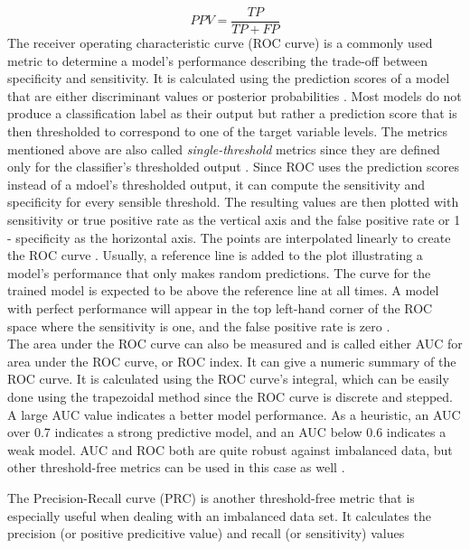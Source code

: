 \begin{equation}
 PPV = \frac{TP}{TP+FP}
 \label{eq:ppv}
\end{equation}
The receiver operating characteristic curve (ROC curve) is a commonly used 
metric to determine a model's performance describing the trade-off between 
specificity and sensitivity. It is calculated using the prediction scores of a 
model that are either discriminant values or posterior 
probabilities \cite{RN161}. Most models do not produce a classification label 
as their output but rather a prediction score that is then thresholded to 
correspond to one of the target variable levels. The metrics mentioned above 
are also called \textit{single-threshold} metrics since they are defined only 
for the 
classifier's thresholded output \cite{RN161, RN167}. Since ROC uses the 
prediction scores instead of a mdoel's thresholded output, it can compute 
the sensitivity and specificity for every sensible threshold. The resulting 
values are then plotted with sensitivity or true positive rate as the vertical 
axis and the false positive rate or 1 - specificity as the 
horizontal axis. The points are interpolated linearly to create the ROC curve  
\cite{RN161}. Usually, a reference line is added to the plot illustrating a 
model's performance that only makes random predictions. The curve for the 
trained model is expected to be above the reference line at all times. 
A model with perfect performance will appear in the top left-hand corner 
of the ROC space where the sensitivity is one, and the false positive rate is 
zero \cite{RN167, RN159}.
\\
The area under the ROC curve can also be measured and is called either AUC for 
area under the ROC curve, or ROC index. It can give a numeric summary of the 
ROC curve. It is calculated using the ROC curve's integral, which can be easily 
done using the trapezoidal method since the ROC curve is discrete and stepped. 
A large AUC value indicates a better model performance. As a heuristic, an 
AUC over 0.7 indicates a strong predictive model, and an AUC below 0.6 
indicates 
a weak model. AUC and ROC both are quite robust against imbalanced data, but 
other threshold-free metrics can be used in this case as 
well \cite{RN167, RN159}.
\par
The Precision-Recall curve (PRC) is another threshold-free metric that is 
especially useful when dealing with an imbalanced data set. It calculates the 
precision (or positive predicitive value) and recall (or sensitivity) values 
